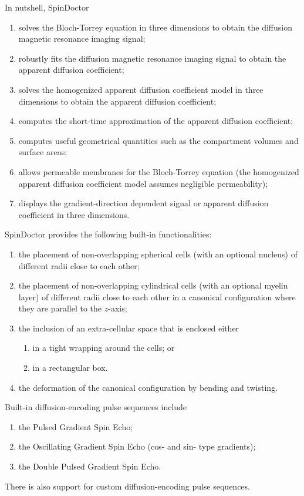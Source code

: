 \documentclass[a4paper]{article}
\begin{document}
In nutshell, SpinDoctor
\begin{enumerate}
    \item solves the Bloch-Torrey equation in three dimensions to obtain the diffusion magnetic resonance imaging signal;
    \item robustly fits the diffusion magnetic resonance imaging signal to obtain the apparent diffusion coefficient;
    \item solves the homogenized apparent diffusion coefficient model in three dimensions to obtain the	apparent diffusion coefficient;
    \item computes the short-time approximation of the apparent diffusion coefficient;
    \item computes useful geometrical quantities such as the compartment volumes and surface areas;
    \item allows permeable membranes for the Bloch-Torrey equation (the homogenized apparent diffusion coefficient model assumes negligible permeability);
    \item displays the gradient-direction dependent signal or apparent diffusion coefficient in three dimensions.
\end{enumerate}

SpinDoctor provides the following built-in functionalities:
\begin{enumerate}
    \item the placement of non-overlapping spherical cells (with an optional nucleus) of different radii close to each other;
    \item the placement of non-overlapping cylindrical cells (with an optional myelin layer) of different radii close to each other in a canonical configuration where they are parallel to the $z$-axis;
    \item the inclusion of an extra-cellular space that is enclosed either
          \begin{enumerate}
              \item in a tight wrapping around the cells; or
              \item in a rectangular box.
          \end{enumerate}
    \item the deformation of the canonical configuration by bending and twisting.
\end{enumerate}

Built-in diffusion-encoding pulse sequences include
\begin{enumerate}
    \item the Pulsed Gradient Spin Echo;
    \item the Oscillating Gradient Spin Echo (cos- and sin- type gradients);
    \item the Double Pulsed Gradient Spin Echo.
\end{enumerate}
There is also support for custom diffusion-encoding pulse sequences.
\end{document}

